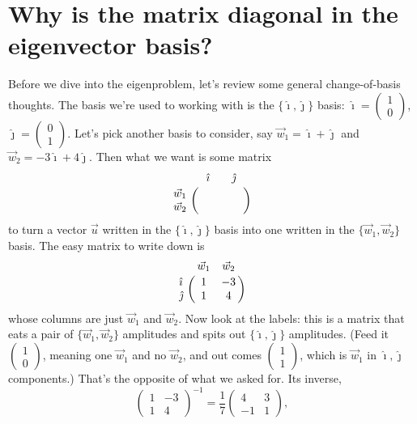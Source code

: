 \documentclass[12pt]{article}
\numberwithin{equation}{section}
\begin{document}
\section{Why is the matrix diagonal in the eigenvector basis?}
\label{sec:diagonal}

Before we dive into the eigenproblem, let's review some general
change-of-basis thoughts. The basis we're used to working with is the
$\{\hat{\imath}, \hat{\jmath}\}$ basis: $\hat{\imath} =
\left(\begin{smallmatrix} 1 \\ 0 \end{smallmatrix}\right)$, $\hat{\jmath} =
\left(\begin{smallmatrix} 0 \\ 1 \end{smallmatrix}\right)$. Let's pick
another basis to consider, say $\vec{w}_1 = \hat{\imath} + \hat{\jmath}$ and
$\vec{w}_2 = -3\hat{\imath} + 4\hat{\jmath}$. Then what we want is some
matrix
\begin{equation*}
  \lmat{\hat{\imath}}{\hat{\jmath}}{\vec{w}_1}{\vec{w}_2}{\phantom{-3}}{\phantom{-3}}{\phantom{-3}}{\phantom{-3}}
\end{equation*}
to turn a vector $\vec{u}$ written in the $\{\hat{\imath}, \hat{\jmath}\}$
basis into one written in the $\{\vec{w}_1, \vec{w}_2\}$ basis. The easy
matrix to write down is
\begin{equation*}
  \lmat{\vec{w}_1}{\vec{w}_2}{\hat{\imath}}{\hat{\jmath}}{1}{-3}{1}{4}
\end{equation*}
whose columns are just $\vec{w}_1$ and $\vec{w}_2$. Now look at the
labels: this is a matrix that eats a pair of $\{\vec{w}_1, \vec{w}_2\}$
amplitudes and spits out $\{\hat{\imath}, \hat{\jmath}\}$ amplitudes.
(Feed it $\left(\begin{smallmatrix} 1 \\ 0 \end{smallmatrix}\right)$,
meaning one $\vec{w}_1$ and no $\vec{w}_2$, and out comes
$\left(\begin{smallmatrix} 1 \\ 1 \end{smallmatrix}\right)$, which is
$\vec{w}_1$ in $\hat{\imath}, \hat{\jmath}$ components.) That's the
opposite of what we asked for. Its inverse,
\begin{equation*}
  \begin{pmatrix} 1 & -3 \\ 1 & 4 \end{pmatrix}^{-1}
  = \frac{1}{7}\begin{pmatrix} 4 & 3 \\ -1 & 1 \end{pmatrix},
\end{equation*}
\end{document}
